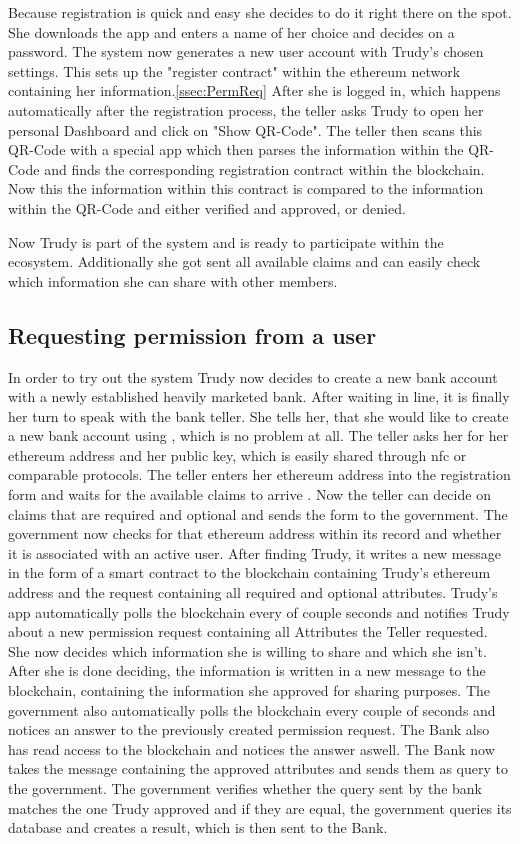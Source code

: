 Because registration is quick and easy she decides to do it right there on the spot. She downloads the app and enters a name of her choice and decides on a password. The system now generates a new user account with Trudy's chosen settings. This sets up the "register contract" within the ethereum network containing her information.\ref{ssec:PermReq} After she is logged in, which happens automatically after the registration process, the teller asks Trudy to open her personal Dashboard and click on "Show QR-Code". The teller then scans this QR-Code with a special app which then parses the information within the QR-Code and finds the corresponding registration contract within the blockchain. Now this the information within this contract is compared to the information within the QR-Code and either verified and approved, or denied.

Now Trudy is part of the system and is ready to participate within the \projectName{} ecosystem. Additionally she got sent all available claims and can easily check which information she can share with other members.

\subsection{Requesting permission from a user}
\label{ssec:requestingPermission}
In order to try out the system Trudy now decides to create a new bank account with a newly established heavily marketed bank. After waiting in line, it is finally her turn to speak with the bank teller. She tells her, that she would like to create a new bank account using \projectName{}, which is no problem at all. The teller asks her for her ethereum address and her public key, which is easily shared through nfc or comparable protocols.
The teller enters her ethereum address into the registration form and waits for the available claims to arrive . Now the teller can decide on claims that are required and optional and sends the form to the government.
The government now checks for that ethereum address within its record and whether it is associated with an active user. After finding Trudy, it writes a new message in the form of a smart contract to the blockchain containing Trudy's ethereum address and the request containing all required and optional attributes.
Trudy's app automatically polls the blockchain every of couple seconds and notifies Trudy about a new permission request containing all Attributes the Teller requested. She now decides which information she is willing to share and which she isn't. After she is done deciding, the information is written in a new message to the blockchain, containing the information she approved for sharing purposes.
The government also automatically polls the blockchain every couple of seconds and notices an answer to the previously created permission request.
The Bank also has read access to the blockchain and notices the answer aswell. The Bank now takes the message containing the approved attributes and sends them as query to the government.
The government verifies whether the query sent by the bank matches the one Trudy approved and if they are equal, the government queries its database and creates a result, which is then sent to the Bank.


